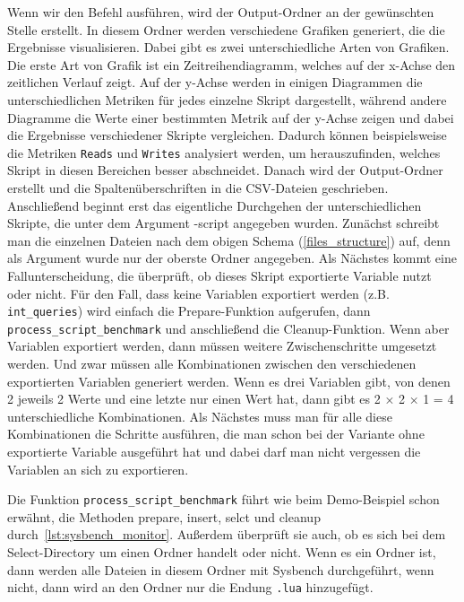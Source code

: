 Wenn wir den Befehl ausführen, wird der Output-Ordner an der gewünschten Stelle erstellt.
In diesem Ordner werden verschiedene Grafiken generiert, die die Ergebnisse visualisieren.
Dabei gibt es zwei unterschiedliche Arten von Grafiken.
Die erste Art von Grafik ist ein Zeitreihendiagramm, welches auf der x-Achse den zeitlichen Verlauf zeigt.
Auf der y-Achse werden in einigen Diagrammen die unterschiedlichen Metriken für jedes einzelne Skript dargestellt, während andere Diagramme die Werte einer bestimmten Metrik auf der y-Achse zeigen und dabei die Ergebnisse verschiedener Skripte vergleichen.
Dadurch können beispielsweise die Metriken \texttt{Reads} und \texttt{Writes} analysiert werden, um herauszufinden, welches Skript in diesen Bereichen besser abschneidet.
Danach wird der Output-Ordner erstellt und die Spaltenüberschriften in die CSV-Dateien geschrieben.
Anschließend beginnt erst das eigentliche Durchgehen der unterschiedlichen Skripte, die unter dem Argument -script angegeben wurden.
Zunächst schreibt man die einzelnen Dateien nach dem obigen Schema (\ref{files_structure}) auf, denn als Argument wurde nur der oberste Ordner angegeben.
Als Nächstes kommt eine Fallunterscheidung, die überprüft, ob dieses Skript exportierte Variable nutzt oder nicht.
Für den Fall, dass keine Variablen exportiert werden (z.B. \texttt{int\_queries}) wird einfach die Prepare-Funktion aufgerufen, dann \texttt{process\_script\_benchmark} und anschließend die Cleanup-Funktion.
Wenn aber Variablen exportiert werden, dann müssen weitere Zwischenschritte umgesetzt werden.
Und zwar müssen alle Kombinationen zwischen den verschiedenen exportierten Variablen generiert werden.
Wenn es drei Variablen gibt, von denen 2 jeweils 2 Werte und eine letzte nur einen Wert hat, dann gibt es 2 × 2 × 1 = 4 unterschiedliche Kombinationen.
Als Nächstes muss man für alle diese Kombinationen die Schritte ausführen, die man schon bei der Variante ohne exportierte Variable ausgeführt hat und dabei darf man nicht vergessen die Variablen an sich zu exportieren.

\vspace{-5pt}

\vspace{-5pt}

Die Funktion \texttt{process\_script\_benchmark} führt wie beim Demo-Beispiel schon erwähnt, die Methoden prepare, insert, selct und cleanup durch~\ref{lst:sysbench_monitor}.
Außerdem überprüft sie auch, ob es sich bei dem Select-Directory um einen Ordner handelt oder nicht.
Wenn es ein Ordner ist, dann werden alle Dateien in diesem Ordner mit Sysbench durchgeführt, wenn nicht, dann wird an den Ordner nur die Endung \texttt{.lua} hinzugefügt.

